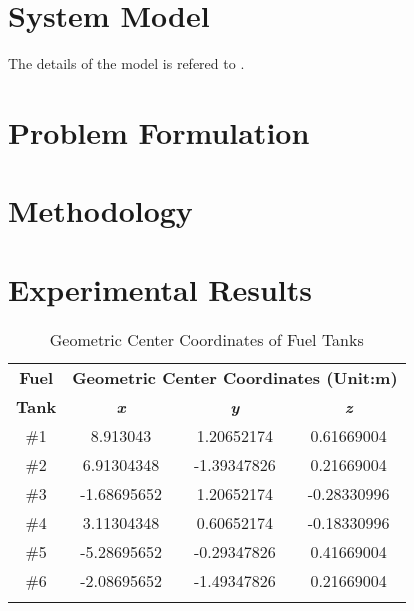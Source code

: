 \documentclass[english]{cccconf}
\begin{document}

\section{System Model}
The details of the model is refered to \cite{miao2021optimal}.



\section{Problem Formulation}




\section{Methodology}

\section{Experimental Results}

\begin{table}[htbp]
  \caption{Geometric Center Coordinates of Fuel Tanks}
  \begin{center}
  \begin{tabular}{c|c|c|c}
  \hhline
  \textbf{Fuel}&\multicolumn{3}{|c|}{\textbf{Geometric Center Coordinates (Unit:m)}} \\
  \cline{2-4} 
  \textbf{Tank} & \textbf{\textit{x}}& \textbf{\textit{y}}& \textbf{\textit{z}} \\
  \hline
  \#1 & 8.913043& 1.20652174 & 0.61669004\\%
  \#2 & 6.91304348 & -1.39347826 & 0.21669004 \\
  \#3 & -1.68695652 & 1.20652174 & -0.28330996 \\
  \#4 & 3.11304348 & 0.60652174 & -0.18330996\\
  \#5 & -5.28695652 & -0.29347826 & 0.41669004\\
  \#6 & -2.08695652 & -1.49347826 & 0.21669004\\
  \hhline
  \end{tabular}
  \label{Table:Geometric Center}
  \end{center}
  \end{table}
\end{document}
